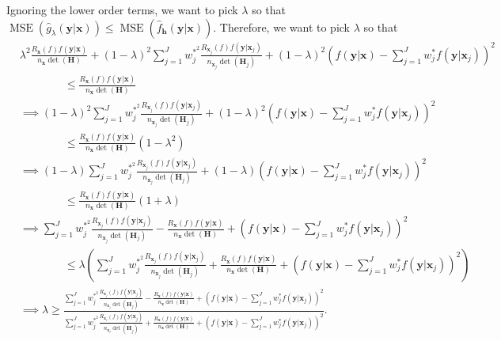 \documentclass[11pt]{article}
\newcommand{\Hbf}{\textbf{H}}
\newcommand{\y}{\textbf{y}}
\newcommand{\x}{\textbf{x}}
\newcommand{\h}{\textbf{h}}
\newcommand{\wstar}{w^{\textstyle{*}}}
\newcommand{\wstarsq}{w^{\textstyle{*}^2}}
\newcommand{\wstarpwr}{w^{\textstyle{*}^{5/4}}}
\DeclareMathOperator{\MSE}{MSE}
\begin{document}
Ignoring the lower order terms, we want to pick $\lambda$ so that $\MSE(\hat g_\lambda(\y|\x)) \leq \MSE(\hat f_\h(\y|\x))$. Therefore, we want to pick $\lambda$ so that 
\begin{align*}
  &\lambda^2 \frac{R_{\x}(f)f(\y|\x)}{n_\x\det(\Hbf)} 
    + (1 - \lambda)^2\sum_{j=1}^J\wstarsq_j\frac{R_{\x_j}(f)f(\y|\x_j)}{n_{\x_j}\det(\Hbf_j)} 
    + (1-\lambda)^2\left(f(\y|\x) - \sum_{j=1}^J\wstar_jf(\y|\x_j)\right)^2 \\
	&\qquad\qquad\leq \frac{R_{\x}(f)f(\y|\x)}{n_\x\det(\Hbf)} \\
  &\implies (1 - \lambda)^2\sum_{j=1}^J\wstarsq_j\frac{R_{\x_j}(f)f(\y|\x_j)}{n_{\x_j}\det(\Hbf_j)} 
    + (1-\lambda)^2\left(f(\y|\x) - \sum_{j=1}^J\wstar_jf(\y|\x_j)\right)^2 \\
    &\qquad\qquad\leq \frac{R_{\x}(f)f(\y|\x)}{n_\x\det(\Hbf)}(1 - \lambda^2) \\
  &\implies (1 - \lambda)\sum_{j=1}^J\wstarsq_j\frac{R_{\x_j}(f)f(\y|\x_j)}{n_{\x_j}\det(\Hbf_j)} 
    + (1-\lambda)\left(f(\y|\x) - \sum_{j=1}^J\wstar_jf(\y|\x_j)\right)^2 \\
    &\qquad\qquad\leq \frac{R_{\x}(f)f(\y|\x)}{n_\x\det(\Hbf)}(1 + \lambda) \\
  &\implies \sum_{j=1}^J\wstarsq_j\frac{R_{\x_j}(f)f(\y|\x_j)}{n_{\x_j}\det(\Hbf_j)} 
    - \frac{R_{\x}(f)f(\y|\x)}{n_\x\det(\Hbf)}
    + \left(f(\y|\x) - \sum_{j=1}^J\wstar_jf(\y|\x_j)\right)^2 \\
    &\qquad\qquad\leq 
    \lambda\left(\sum_{j=1}^J\wstarsq_j\frac{R_{\x_j}(f)f(\y|\x_j)}{n_{\x_j}\det(\Hbf_j)}
    + \frac{R_{\x}(f)f(\y|\x)}{n_\x\det(\Hbf)} 
    + \left(f(\y|\x) - \sum_{j=1}^J\wstar_jf(\y|\x_j)\right)^2\right) \\
  &\implies \lambda \geq
  \frac
  {
    \sum_{j=1}^J\wstarsq_j\frac{R_{\x_j}(f)f(\y|\x_j)}{n_{\x_j}\det(\Hbf_j)} 
      - \frac{R_{\x}(f)f(\y|\x)}{n_\x\det(\Hbf)}
      + \left(f(\y|\x) - \sum_{j=1}^J\wstar_jf(\y|\x_j)\right)^2
  }
  {
    \sum_{j=1}^J\wstarsq_j\frac{R_{\x_j}(f)f(\y|\x_j)}{n_{\x_j}\det(\Hbf_j)}
      + \frac{R_{\x}(f)f(\y|\x)}{n_\x\det(\Hbf)} 
      + \left(f(\y|\x) - \sum_{j=1}^J\wstar_jf(\y|\x_j)\right)^2
  }. 
\end{align*}

\end{document}
